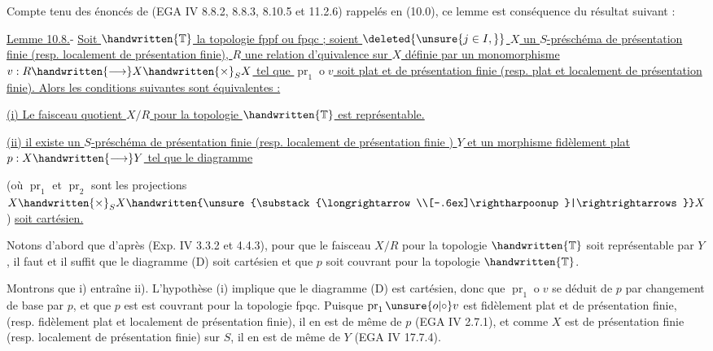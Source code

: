 Compte tenu des énoncés de (EGA IV 8.8.2, 8.8.3, 8.10.5 et 11.2.6) rappelés en (10.0), ce lemme est conséquence du résultat suivant :

\uline{Lemme 10.8.}- \uline{Soit $\handwritten{\mathbb{T}}$ la topologie fppf ou fpqc ; soient $\deleted{\unsure{j\in I,}}$ $X$ un $S$-préschéma de présentation finie (resp. localement de présentation finie), $R$ une relation d'quivalence sur $X$ définie par un monomorphisme $v:R\handwritten{\longrightarrow}X\handwritten{\times}_S X$ tel que $\operatorname{pr}_1\mathbin{o} v$ soit plat et de présentation finie (resp. plat et localement de présentation finie). Alors les conditions suivantes sont équivalentes :}

\uline{(i) Le faisceau quotient $X/R$ pour la topologie $\handwritten{\mathbb{T}}$ est représentable.}

\uline{(ii) il existe un $S$-préschéma de présentation finie (resp. localement de présentation finie ) $Y$ et un morphisme fidèlement plat $p:X\handwritten{\longrightarrow}Y$ tel que le diagramme}


(où $\operatorname{pr}_1$ et $\operatorname{pr}_2$ sont les projections $X\handwritten{\times}_S X\handwritten{\unsure{\substack{\longrightarrow\\[-.6ex]\rightharpoonup}|\rightrightarrows}}X$) \uline{soit cartésien.}

Notons d'abord que d'après (Exp. IV 3.3.2 et 4.4.3), pour que le faisceau $X/R$  pour la topologie $\handwritten{\mathbb{T}}$ soit représentable par $Y$, il faut et il suffit que le diagramme (D) soit cartésien et que $p$ soit couvrant pour la topologie $\handwritten{\mathbb{T}}$.

Montrons que i) entraîne ii). L'hypothèse (i) implique que le diagramme (D) est cartésien, donc que $\operatorname{pr}_1\mathbin{o} v$ se déduit de $p$ par changement de base par $p$, et que $p$ est
est couvrant pour la topologie fpqc. Puisque $\operatorname{pr}_1\mathbin{\unsure{o|\circ}} v$ est fidèlement plat et de présentation finie, (resp. fidèlement plat et localement de présentation finie), il en est de même de $p$ (EGA IV 2.7.1), et comme $X$ est de présentation finie (resp. localement de présentation finie) sur $S$, il en est de même de $Y$ (EGA IV 17.7.4).

